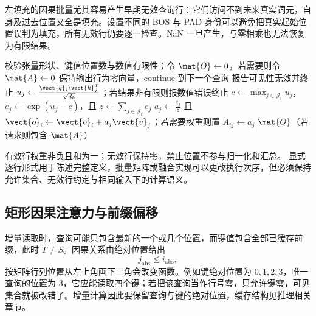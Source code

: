 \documentclass[../textbook.tex]{subfiles}
\begin{document}
左填充的因果批量尤其容易产生早期无效查询行：它们访问不到未来真实词元，自身及过去位置又全是填充。设置不同的 BOS 与 PAD 身份可以避免把真实起始位置误判为填充，所有无效行仍要逐一检查。NaN 一旦产生，与零相乘也无法恢复为有限结果。


\begin{algorithm}[具有严格可见性的单头注意力]
\label{alg:attn-masked}
\begin{myalgorithmic}[1]
\State 校验张量形状、键值位置数与数值有限性；令 $\mat{O}\gets0$，若需要则令 $\mat{A}\gets0$
    \State 保持输出行为零向量，continue 到下一个查询
  \Else
      \State 报告可见性无效并终止
    \EndIf
      \State $u_j\gets\frac{\vect{q}_i \vect{k}_j^{\mathrm{T}}}{\sqrt{d_k}}$；若结果非有限则报数值错误终止
    \EndFor
    \State $c\gets\max_{j\in\mathcal J_i}u_j$，$e_j\gets\exp(u_j-c)$，且 $z\gets\sum_{j\in\mathcal J_i}e_j$
      \State $a_j\gets\frac{e_j}{z}$ 且 $\vect{o}_i\gets \vect{o}_i+a_j\vect{v}_j$；若需要权重则置 $A_{ij}\gets a_j$
    \EndFor
  \EndIf
\EndFor
\State \Return $\mat{O}$（若请求则包含 $\mat{A}$）
\end{myalgorithmic}
有效行权重非负且和为一；无效行保持零，禁止位置不参与归一化和汇总。
显式逐行形式用于陈述完整定义，批量矩阵或融合实现可以更改执行次序，但必须保持允许集合、无效行约定与相同输入下的计算语义。
\end{algorithm}

\subsection{矩形因果注意力与前缀偏移}
增量读取时，查询可能只包含最新的一个或几个位置，而键值包含全部已缓存前缀，此时 $T\ne S$。因果关系由绝对位置给出
\begin{equation}
 j_{\mathrm{abs}}\leq i_{\mathrm{abs}},
\end{equation}
按矩阵行列位置从左上角画下三角会改变函数。例如键绝对位置为 $0,1,2,3$，唯一查询的位置为 $3$，它应能读取四个键；若把该查询当作行号零，只允许键零，可见集合就被改错了。增量计算因此要保留查询与键的绝对位置，缓存结构见推理相关章节。
\end{document}
